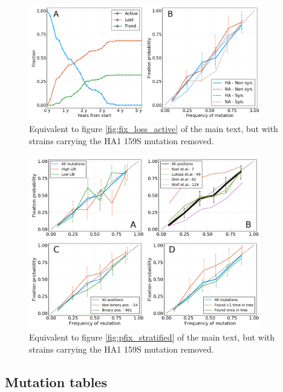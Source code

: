 \documentclass[reprint,amsmath,amssymb,superscriptaddress,showpacs,pre]{revtex4-1}
\begin{document}
\begin{figure}
	\centering
	\includegraphics[width=0.9\textwidth]{./SM_figures/cutoff_159S_p1.png}
	\caption{Equivalent to figure \ref{fig:fix_loss_active} of the main text, but with strains carrying the HA1 159S mutation removed.}
	\label{fig:cutoff_159S_p1}
\end{figure}

\begin{figure}
	\centering
	\includegraphics[width=0.9\textwidth]{./SM_figures/pfix_v_freq_strat_h3n2_cutoff159S.png}
	\caption{Equivalent to figure \ref{fig:pfix_stratified} of the main text, but with strains carrying the HA1 159S mutation removed.}
	\label{fig:cutoff_159S_p2}
\end{figure}



\newpage
\subsection{Mutation tables}
\end{document}
